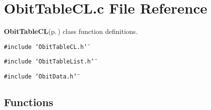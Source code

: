 \section{Obit\-Table\-CL.c File Reference}
\label{ObitTableCL_8c}
{\bf Obit\-Table\-CL}{\rm (p.\,\pageref{structObitTableCL})} class function definitions. 

{\tt \#include \char`\"{}Obit\-Table\-CL.h\char`\"{}}\par
{\tt \#include \char`\"{}Obit\-Table\-List.h\char`\"{}}\par
{\tt \#include \char`\"{}Obit\-Data.h\char`\"{}}\par
\subsection*{Functions}
